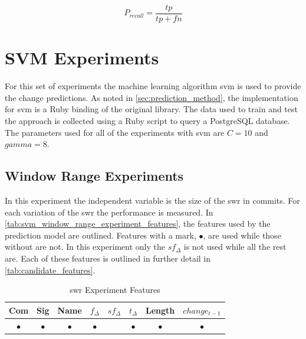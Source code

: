 \begin{equation} 
\label{eq:recall}
P_{recall} = \frac{tp}{tp+fn}
\end{equation}

\section{SVM Experiments}
\label{sec:svm_experiments}

For this set of experiments the machine learning algorithm \gls{svm} is used to provide the change predictions. As noted in \autoref{sec:prediction_method}, the implementation for \gls{svm} is a Ruby binding of the original library. The data used to train and test the approach is collected using a Ruby script to query a PostgreSQL database. The parameters used for all of the experiments with \gls{svm} are $C = 10$ and $gamma = 8$.


\subsection{Window Range Experiments}
\label{sec:svm_swr_experiment}


In this experiment the independent variable is the size of the \gls{swr} in commits. For each variation of the \gls{swr} the performance is measured. In \autoref{tab:svm_window_range_experiment_features}, the features used by the prediction model are outlined. Features with a mark, $\bullet$, are used while those without are not. In this experiment only the $sf_{\Delta}$ is not used while all the rest are. Each of these features is outlined in further detail in \autoref{tab:candidate_features}.

\begin{table}[h]
\begin{center}

    \begin{tabular}{|c|c|c|c|c|c|c|c|}
        \hline
        Com & Sig & Name & $f_{\Delta}$ & $sf_{\Delta}$ & $t_\Delta$ & Length & $change_{t-1}$ \\
        \hline
        $\bullet$ & $\bullet$ & $\bullet$ & $\bullet$ & & $\bullet$ & $\bullet$ & $\bullet$ \\ \hline
    \end{tabular}
    \caption{\gls{swr} Experiment Features}
    \label{tab:svm_window_range_experiment_features}
\end{center}
\end{table}

